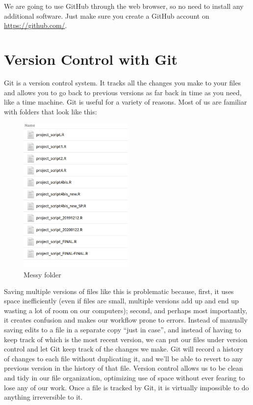 \documentclass[
]{book}
\begin{document}
We are going to use GitHub through the web browser, so no need to install any
additional software. Just make sure you create a GitHub account on \url{https://github.com/}.

\hypertarget{version-control-git}{%
\chapter{Version Control with Git}\label{version-control-git}}

Git is a version control system. It tracks all the changes you make to your files and allows you to go back to previous versions as far back in time as you need, like a time machine. Git is useful for a variety of reasons. Most of us are familiar with folders that look like this:

\begin{figure}
\centering
\includegraphics[width=0.5\textwidth,height=\textheight]{img/version-nightmare.png}
\caption{Messy folder}
\end{figure}

Saving multiple versions of files like this is problematic because, first, it uses space inefficiently (even if files are small, multiple versions add up and end up wasting a lot of room on our computers); second, and perhaps most importantly, it creates confusion and makes our workflow prone to errors. Instead of manually saving edits to a file in a separate copy ``just in case'', and instead of having to keep track of which is the most recent version, we can put our files under version control and let Git keep track of the changes we make. Git will record a history of changes to each file without duplicating it, and we'll be able to revert to any previous version in the history of that file. Version control allows us to be clean and tidy in our file organization, optimizing use of space without ever fearing to lose any of our work. Once a file is tracked by Git, it is virtually impossible to do anything irreversible to it.
\end{document}
